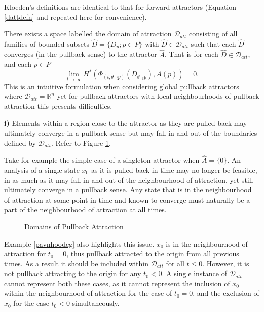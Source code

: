 \documentclass{article}
\begin{document}
Kloeden's definitions are identical to that for forward attractors (Equation
\ref{dattdefn} and repeated here for convenience).

There exists a space labelled the domain of attraction
$\mathcal{D}_{att}$ consisting of all families of bounded subsets
$\hat{D} = \{D_p ; p \in P \}$ with $\hat{D} \in
\mathcal{D}_{att}$ such that each $\hat{D}$ converges (in the
pullback sense) to the attractor $\hat{A}$. That is for each
$\hat{D} \in \mathcal{D}_{att}$, and each $p \in P$
\[ \lim_{t \to \infty} H^*( \Phi_{(t,
                  \theta_{-t} p)}(D_{\theta_{-t}p}),            A(p)) = 0. \]
This is an intuitive formulation when considering global pullback
attractors where $\mathcal{D}_{att} = \mathbb{R}^n$ yet for pullback attractors
with local neighbourhoods of pullback attraction this presents
difficulties.

\textbf{i)} Elements within a region close to the attractor as they are
pulled back may ultimately converge in a pullback sense but may fall in and
out of the boundaries defined by $\mathcal{D}_{att}$. Refer to Figure
\ref{dattfig}.

Take for example the simple case of a singleton attractor when $\hat{A} = \{0
\}$. An analysis of a single state $x_0$ as it is pulled back in time may no
longer be feasible, in as much as it may fall in and out of the neighbourhood of
attraction, yet still ultimately converge in a pullback sense. Any state that is
in the neighbourhood of attraction at some point in time and known to converge
must naturally be a part of the neighbourhood of attraction at all times.

\begin{figure}
\begin{center}

\caption{Domains of Pullback Attraction}
\protect\label{dattfig}
\end{center}
\end{figure}

Example \ref{pavnhoodeg} also highlights this issue. $x_0$ is in
the neighbourhood of attraction for $t_0 = 0$, thus pullback attracted to the
origin from all previous times. As a result it should be included
within $\mathcal{D}_{att}$ for all $t \leq 0$.  However, it is not pullback
attracting to the origin for any $t_0 < 0$. A single instance of
$\mathcal{D}_{att}$ cannot represent both these cases, as it cannot represent
the inclusion of $x_0$ within the neighbourhood of attraction for the case of
$t_0 = 0$, and the exclusion of $x_0$ for the case $t_0 < 0$ simultaneously.
\end{document}
